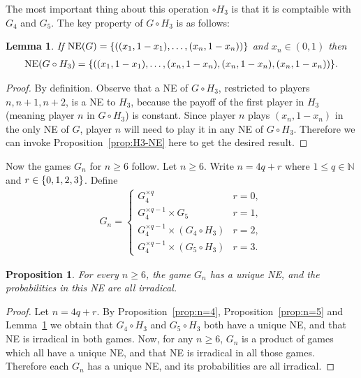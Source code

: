 \documentclass[preprint,12pt,authoryear]{elsarticle}
\newtheorem{proposition}[theorem]{Proposition}
\newtheorem{lemma}[theorem]{Lemma}
\newcommand{\N}{\mathbb{N}}
\DeclarePairedDelimiter{\ios}{\{}{\}}
\newcommand{\s}{\ios*}
\DeclareMathOperator{\NE}{NE}
\begin{document}
The most important thing about this operation $\circ H_3$ is that it is comptaible with 
$G_4$ and $G_5$. The key property of $G\circ H_3$ is as follows:

\begin{lemma}\label{lmm:circ-ne}
  If $\NE(G)=\s{((x_1,1-x_1),\ldots,(x_n,1-x_n))}$ and $x_n\in(0,1)$ then
  \begin{align*}
    \NE(G\circ H_3)=\s{((x_1,1-x_1),\ldots,(x_n,1-x_n),(x_n,1-x_n),(x_n,1-x_n))}.
  \end{align*}
\end{lemma}
\begin{proof}
  By definition. Observe that a NE of $G\circ H_3$, restricted to players $n,n+1,n+2$, is a 
  NE to $H_3$, because the payoff of the first player in $H_3$ (meaning player $n$ in $G\circ H_3$) is constant. Since player $n$ plays $(x_n,1-x_n)$ in the only NE of $G$, player $n$ will need to play it in any NE of $G\circ H_3$. Therefore we 
  can invoke Proposition~\ref{prop:H3-NE} here to get the desired result.
\end{proof}

Now the games $G_n$ for $n\ge6$ follow. Let $n\ge6$. Write $n=4q+r$ where $1\le q\in\N$ and 
$r\in\s{0,1,2,3}$. Define
\begin{align}
  G_n=\begin{cases}
    G_4^{\times q}&r=0,\\
    G_4^{\times q-1}\times G_5&r=1,\\
    G_4^{\times q-1}\times(G_4\circ H_3)&r=2,\\
    G_4^{\times q-1}\times(G_5\circ H_3)&r=3.
  \end{cases}
\end{align}

\begin{proposition}\label{prop:n>=6}
  For every $n\ge6$, the game $G_n$ has a unique NE, and the probabilities in this NE are 
  all irradical.
\end{proposition}
\begin{proof}
  Let $n=4q+r$. By Proposition~\ref{prop:n=4}, Proposition~\ref{prop:n=5} and 
  Lemma~\ref{lmm:circ-ne} we obtain that $G_4\circ H_3$ and $G_5\circ H_3$ both have a 
  unique NE, and that NE is irradical in both games. Now, for any $n\ge6$, $G_n$ is a 
  product of games which all have a unique NE, and that NE is irradical in all those games. Therefore each $G_n$ has a unique NE, and its probabilities are all irradical.
\end{proof}
\end{document}
